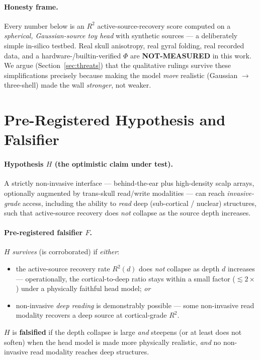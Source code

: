 \documentclass[11pt]{article}
\newcommand{\Rsq}{R^{2}}
\newcommand{\redbox}[1]{\textcolor{red!70!black}{\textbf{#1}}}
\begin{document}
\paragraph{Honesty frame.} Every number below is an $\Rsq$ active-source-recovery
score computed on a \emph{spherical, Gaussian-source toy head} with synthetic
sources --- a deliberately simple in-silico testbed. Real skull anisotropy, real
gyral folding, real recorded data, and a hardware-/builtin-verified $\Phi$ are
\textbf{NOT-MEASURED} in this work. We argue (Section~\ref{sec:threats}) that the
qualitative rulings survive these simplifications precisely because making the model
\emph{more} realistic (Gaussian $\rightarrow$ three-shell) made the wall
\emph{stronger}, not weaker.

\section{Pre-Registered Hypothesis and Falsifier}
\label{sec:hypothesis}

\paragraph{Hypothesis $H$ (the optimistic claim under test).}
A strictly non-invasive interface --- behind-the-ear plus high-density scalp arrays,
optionally augmented by trans-skull read/write modalities --- can reach
\emph{invasive-grade} access, including the ability to \emph{read} deep
(sub-cortical / nuclear) structures, such that active-source recovery does
\emph{not} collapse as the source depth increases.

\paragraph{Pre-registered falsifier $F$.} $H$ \emph{survives} (is corroborated) if
\emph{either}:
\begin{itemize}
  \item[\textbf{F1}] the active-source recovery rate $\Rsq(d)$ does \emph{not}
        collapse as depth $d$ increases --- operationally, the
        cortical-to-deep ratio stays within a small factor ($\lesssim 2\times$)
        under a physically faithful head model; \emph{or}
  \item[\textbf{F2}] non-invasive \emph{deep reading} is demonstrably possible ---
        some non-invasive read modality recovers a deep source at cortical-grade
        $\Rsq$.
\end{itemize}
$H$ is \redbox{falsified} if the depth collapse is large \emph{and} steepens (or at
least does not soften) when the head model is made more physically realistic,
\emph{and} no non-invasive read modality reaches deep structures.
\end{document}
